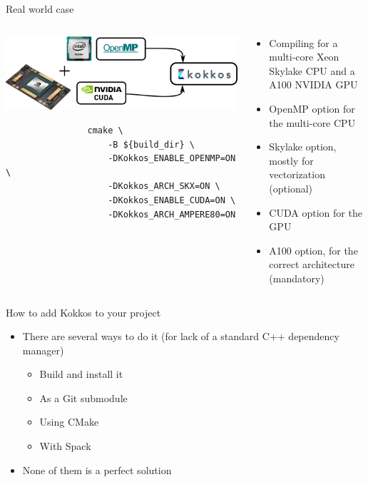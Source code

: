 \documentclass[aspectratio=169]{beamer}
\begin{document}
\begin{frame}[fragile]{Real world case}
    \begin{columns}
        \begin{column}{0.475\linewidth}
            \begin{center}
                \includegraphics[width=\textwidth]{kokkos_a100_backend.png}
            \end{center}
            \begin{verbatim}
                cmake \
                    -B ${build_dir} \
                    -DKokkos_ENABLE_OPENMP=ON \
                    -DKokkos_ARCH_SKX=ON \
                    -DKokkos_ENABLE_CUDA=ON \
                    -DKokkos_ARCH_AMPERE80=ON
            \end{verbatim}
        \end{column}
        \begin{column}{0.525\linewidth}
            \begin{itemize}
                \item Compiling for a multi-core Xeon Skylake CPU and a A100 NVIDIA GPU
                \item OpenMP option for the multi-core CPU
                \item Skylake option, mostly for vectorization (optional)
                \item CUDA option for the GPU
                \item A100 option, for the correct architecture (mandatory)
            \end{itemize}
        \end{column}
    \end{columns}
\end{frame}


\begin{frame}{How to add Kokkos to your project}
    \begin{itemize}
        \item There are several ways to do it (for lack of a standard C++ dependency manager)
        \begin{itemize}
            \item Build and install it
            \item As a Git submodule
            \item Using CMake
            \item With Spack
        \end{itemize}
        \item None of them is a perfect solution
    \end{itemize}
\end{frame}
\end{document}
